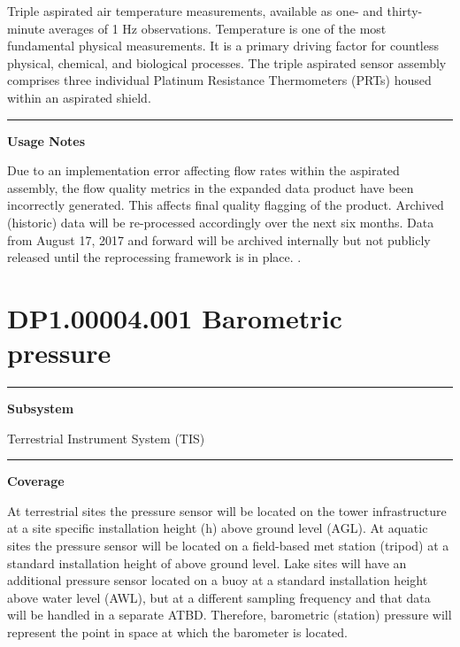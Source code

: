 \documentclass[]{article}
\begin{document}
Triple aspirated air temperature measurements, available as one- and
thirty-minute averages of 1 Hz observations. Temperature is one of the
most fundamental physical measurements. It is a primary driving factor
for countless physical, chemical, and biological processes. The triple
aspirated sensor assembly comprises three individual Platinum Resistance
Thermometers (PRTs) housed within an aspirated shield.

\begin{center}\rule{0.5\linewidth}{\linethickness}\end{center}

\textbf{Usage Notes}

Due to an implementation error affecting flow rates within the aspirated
assembly, the flow quality metrics in the expanded data product have
been incorrectly generated. This affects final quality flagging of the
product. Archived (historic) data will be re-processed accordingly over
the next six months. Data from August 17, 2017 and forward will be
archived internally but not publicly released until the reprocessing
framework is in place. \newpage
.

\section{DP1.00004.001 Barometric
pressure}\label{dp1.00004.001-barometric-pressure}

\begin{center}\rule{0.5\linewidth}{\linethickness}\end{center}

\textbf{Subsystem}

Terrestrial Instrument System (TIS)

\begin{center}\rule{0.5\linewidth}{\linethickness}\end{center}

\textbf{Coverage}

At terrestrial sites the pressure sensor will be located on the tower
infrastructure at a site specific installation height (h) above ground
level (AGL). At aquatic sites the pressure sensor will be located on a
field-based met station (tripod) at a standard installation height of
above ground level. Lake sites will have an additional pressure sensor
located on a buoy at a standard installation height above water level
(AWL), but at a different sampling frequency and that data will be
handled in a separate ATBD. Therefore, barometric (station) pressure
will represent the point in space at which the barometer is located.
\end{document}
